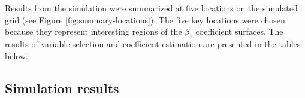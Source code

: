 \documentclass[authoryear, review, 11pt]{elsarticle}
\begin{document}
	
	Results from the simulation were summarized at five locations on the simulated grid (see Figure \ref{fig:summary-locations}). The five key locations were chosen because they represent interesting regions of the $\beta_1$ coefficient surfaces. The results of variable selection and coefficient estimation are presented in the tables below.
	
	
		
	\subsection{Simulation results}
\end{document}
